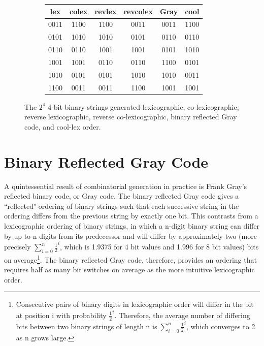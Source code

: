 \begin{figure}[]
\begin{subfigure}[]{\textwidth}
         \begin{center}
             \begin{tabular}{ |c|c|c|c||c||c| } 
                 \hline
                 lex  & colex & revlex & revcolex & Gray & cool\\
                 \hline
                 0011 & 1100 & 1100 & 0011 & 0011 & 1100 \\
                 0101 & 1010 & 1010 & 0101 & 0110 & 0110 \\
                 0110 & 0110 & 1001 & 1001 & 0101 & 1010 \\
                 1001 & 1001 & 0110 & 0110 & 1100 & 0101 \\
                 1010 & 0101 & 0101 & 1010 & 1010 & 0011 \\
                 1100 & 0011 & 0011 & 1100 & 1001 & 1001 \\
                 \hline
             \end{tabular}
         \end{center}
         \label{fig:2c2}
     \end{subfigure}
     \begin{center}

     \end{center}
     \caption{The $2^4$ $4$-bit binary strings generated lexicographic, co-lexicographic, reverse lexicographic, reverse co-lexicographic, binary reflected Gray code, and cool-lex order.}
     \label{fig:bintable}
 \end{figure}


\section{Binary Reflected Gray Code} \label{sec:BRGC}

A quintessential result of combinatorial generation in practice is Frank Gray's reflected binary code, or Gray code. The binary reflected Gray code gives a ``reflected" ordering of binary strings such that each successive string in the ordering differs from the previous string by exactly one bit. This contrasts from a lexicographic ordering of binary strings, in which a n-digit binary string can differ by up to n digits from its predecessor and will differ by approximately two (more precisely $\sum_{i=0}^n\frac{1}{2}^i$, which is 1.9375 for 4 bit values and 1.996 for 8 bit values) bits on average\footnote{Consecutive pairs of binary digits in lexicographic order will differ in the bit at position i with probability $\frac{1}{2}^i$.  Therefore, the average number of differing bits between two binary strings of length n is $\sum_{i=0}^n\frac{1}{2}^i$, which converges to 2 as n grows large.}. The binary reflected Gray code, therefore, provides an ordering that requires half as many bit switches on average as the more intuitive lexicographic order. 

